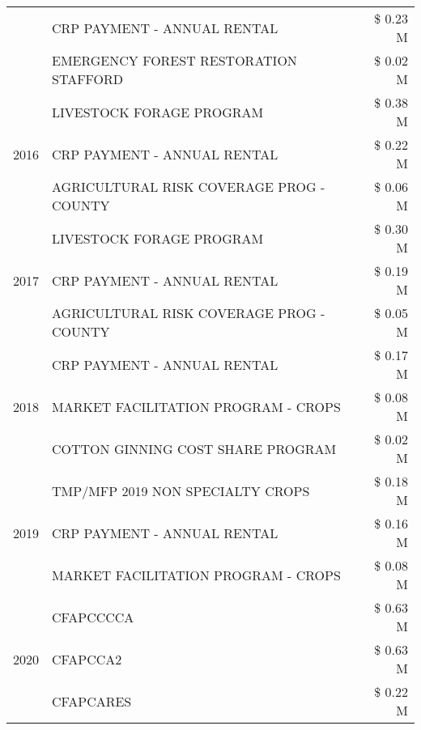 \begin{tabular}{llr}
 & CRP PAYMENT - ANNUAL RENTAL & \$ 0.23 M \\
 & EMERGENCY FOREST RESTORATION STAFFORD & \$ 0.02 M \\
\cline{1-3}
\multirow[t]{3}{*}{2016} & LIVESTOCK FORAGE PROGRAM & \$ 0.38 M \\
 & CRP PAYMENT - ANNUAL RENTAL & \$ 0.22 M \\
 & AGRICULTURAL RISK COVERAGE PROG - COUNTY & \$ 0.06 M \\
\cline{1-3}
\multirow[t]{3}{*}{2017} & LIVESTOCK FORAGE PROGRAM & \$ 0.30 M \\
 & CRP PAYMENT - ANNUAL RENTAL & \$ 0.19 M \\
 & AGRICULTURAL RISK COVERAGE PROG - COUNTY & \$ 0.05 M \\
\cline{1-3}
\multirow[t]{3}{*}{2018} & CRP PAYMENT - ANNUAL RENTAL & \$ 0.17 M \\
 & MARKET FACILITATION PROGRAM - CROPS & \$ 0.08 M \\
 & COTTON GINNING COST SHARE PROGRAM & \$ 0.02 M \\
\cline{1-3}
\multirow[t]{3}{*}{2019} & TMP/MFP 2019 NON SPECIALTY CROPS & \$ 0.18 M \\
 & CRP PAYMENT - ANNUAL RENTAL & \$ 0.16 M \\
 & MARKET FACILITATION PROGRAM - CROPS & \$ 0.08 M \\
\cline{1-3}
\multirow[t]{3}{*}{2020} & CFAPCCCCA & \$ 0.63 M \\
 & CFAPCCA2 & \$ 0.63 M \\
 & CFAPCARES & \$ 0.22 M \\
\cline{1-3}
\bottomrule
\end{tabular}
